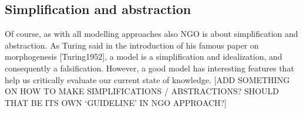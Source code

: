 \subsection{Simplification and abstraction}

Of course, as with all modelling approaches also NGO is about simplification and abstraction. As Turing said in the introduction of his famous paper on morphogenesis [Turing1952], a model is a simplification and idealization, and consequently a falsification. However, a good model has interesting features that help us critically evaluate our current state of knowledge.  [ADD SOMETHING ON HOW TO MAKE SIMPLIFICATIONS / ABSTRACTIONS? SHOULD THAT BE ITS OWN `GUIDELINE’ IN NGO APPROACH?]
  